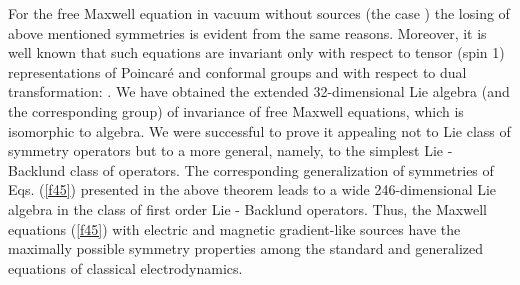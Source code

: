 \documentclass[a4paper,12pt]{article}
\begin{document}
For the free Maxwell equation in vacuum without sources (the case \coordHE{}%
) the losing of above mentioned symmetries is evident from the same reasons.
Moreover, it is well known that such equations are invariant only with
respect to tensor (spin 1) representations of Poincar\'e and conformal
groups and with respect to dual transformation: \coordHE{}. We have obtained the extended 32-dimensional Lie
algebra \cite{Ukr} (and the corresponding group) of invariance of free
Maxwell equations, which is isomorphic to \coordHE{}
algebra. We were successful to prove it appealing not to Lie class of
symmetry operators but to a more general, namely, to the simplest Lie -
Backlund class of operators. The corresponding generalization of symmetries
of Eqs. (\ref{f45}) presented in the above theorem leads to a wide
246-dimensional Lie algebra in the class of first order Lie - Backlund
operators. Thus, the Maxwell equations (\ref{f45}) with electric and
magnetic gradient-like sources have the maximally possible symmetry
properties among the standard and generalized equations of classical
electrodynamics.
\end{document}
